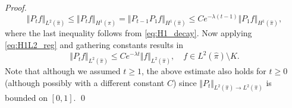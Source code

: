 \begin{proof}
	\begin{equation}
	\Vert P_t f \Vert_{L^2(\widehat{\pi})} \le \Vert P_t f \Vert_{H^1(\widehat{\pi})} = \Vert P_{t-1}P_{1} f \Vert_{H^1(\widehat{\pi})}
	\le C e^{-\lambda (t-1)} \Vert P_{1} f \Vert_{H^1(\widehat{\pi})}, 
	\end{equation}
	where the last inequality follows from \eqref{eq:H1_decay}. Now applying \eqref{eq:H1L2_reg} and gathering constants results in 
	\begin{equation}
	\Vert P_t f\Vert_{L^2(\widehat{\pi})} \le C e^{-\lambda t}\Vert f \Vert_{L^2(\widehat{\pi})}, \quad f \in L^2(\widehat{\pi})\setminus K.
	\end{equation} 
	Note that although we assumed $t\ge1$, the above estimate also holds for $t\ge0$ (although possibly with a different constant $C$) since $\Vert P_t \Vert_{L^2(\widehat{\pi})\rightarrow L^2(\widehat{\pi})}$ is bounded on $[0,1]$. 
	\qed  
\end{proof}
